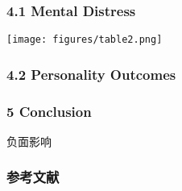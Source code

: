 \documentclass{beamer}
\begin{document}
\begin{frame}
	\frametitle{4.1 Mental Distress}
	\texttt{[image: figures/table2.png]}
\end{frame}

\begin{frame}
	\frametitle{4.2 Personality Outcomes}
\end{frame}


\begin{frame}
	\frametitle{5 Conclusion}
负面影响
\end{frame}




\begin{frame}
    \frametitle{参考文献}


\end{frame}

\end{document}
